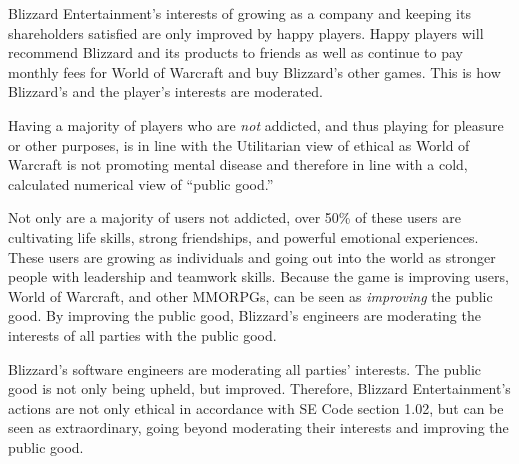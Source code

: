 \documentclass[11pt]{article}
\begin{document}
\begin{multicols}{2}
Blizzard Entertainment's interests of growing as a company and keeping its shareholders satisfied are only improved by happy players. Happy players will recommend Blizzard and its products to friends as well as continue to pay monthly fees for World of Warcraft and buy Blizzard's other games. This is how Blizzard's and the player's interests are moderated.

Having a majority of players who are \emph{not} addicted, and thus playing for pleasure or other purposes, is in line with the Utilitarian view of ethical as World of Warcraft is not promoting mental disease and therefore in line with a cold, calculated numerical view of ``public good.''

Not only are a majority of users not addicted, over 50\% of these users are cultivating life skills, strong friendships, and powerful emotional experiences. \cite{MotivationsAndDerviedExperiences} These users are growing as individuals and going out into the world as stronger people with leadership and teamwork skills. Because the game is improving users, World of Warcraft, and other MMORPGs, can be seen as \emph{improving} the public good. By improving the public good, Blizzard's engineers are moderating the interests of all parties with the public good.

Blizzard's software engineers are moderating all parties' interests. The public good is not only being upheld, but improved. Therefore, Blizzard Entertainment's actions are not only ethical in accordance with SE Code section 1.02, but can be seen as extraordinary, going beyond moderating their interests and improving the public good.

\end{multicols}
\newpage




\end{document}
